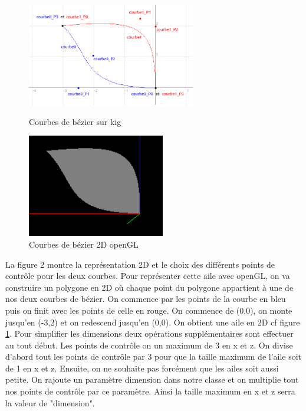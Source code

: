 \documentclass{article}
\begin{document}
\begin{figure}[!htb]
	\begin{minipage}{0.5\textwidth}
    	\centering
    	\includegraphics[height=4.5cm]{./assets/kig_bezier.png}
    	\caption{Courbes de bézier sur kig}
    	\label{fig:kig_bezier}
	\end{minipage}
	\hfill
	\begin{minipage}{0.5\textwidth}
    	\centering
    	\includegraphics[height=4.5cm]{./assets/2D_bezier.png}
    	\caption{Courbes de bézier 2D openGL}
    	\label{fig:2D_bezier}
	\end{minipage}
\end{figure}

La figure 2 montre la représentation 2D et le choix des différents points de contrôle pour les deux courbes. Pour représenter cette aile avec openGL, on va construire un polygone en 2D où chaque point du polygone appartient à une de nos deux courbes de bézier. On commence par les points de la courbe en bleu puis on finit avec les points de celle en rouge. On commence de (0,0), on monte jusqu'en (-3,2) et on redescend jusqu'en (0,0). On obtient une aile en 2D cf figure \ref{fig:2D_bezier}. 
\newline
\newline
Pour simplifier les dimensions deux opérations supplémentaires sont effectuer au tout début. Les points de contrôle on un maximum de 3 en x et z. On divise d'abord tout les points de contrôle par 3 pour que la taille maximum de l'aile soit de 1 en x et z. Ensuite, on ne souhaite pas forcément que les ailes soit aussi petite. On rajoute un paramètre dimension dans notre classe et on multiplie tout nos points de contrôle par ce paramètre. Ainsi la taille maximum en x et z serra la valeur de "dimension".
\end{document}
